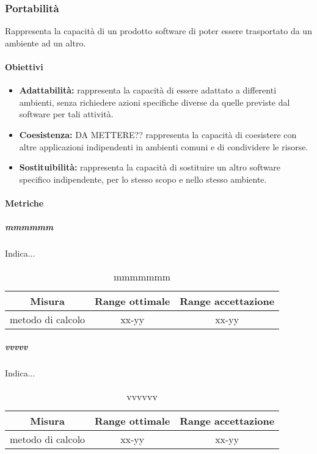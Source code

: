 	\subsubsection{Portabilità}
	Rappresenta la capacità di un prodotto software di poter essere trasportato da un ambiente ad un altro.
		
		\paragraph{Obiettivi}
			\begin{itemize}
				\item \textbf{Adattabilità:} rappresenta la capacità di essere adattato a differenti ambienti, senza richiedere azioni specifiche diverse da quelle previste dal software per tali attività.
				\item \textbf{Coesistenza:} DA METTERE?? rappresenta la capacità di coesistere con altre applicazioni indipendenti in ambienti comuni e di condividere le risorse.
				\item \textbf{Sostituibilità:} rappresenta la capacità di sostituire un altro software specifico indipendente, per lo stesso scopo e nello stesso ambiente.
			\end{itemize}
		
		\paragraph{Metriche}
			\subparagraph{mmmmmm}
			Indica...
			\begin{table}[H]
				\begin{center}
					\begin{tabular}{|c|c|c|}
						\hline
						\textbf{Misura} & \textbf{Range ottimale} & \textbf{Range accettazione} \\
						\hline
						metodo di calcolo & xx-yy  & xx-yy \\
						\hline
					\end{tabular}
				\end{center}
				\caption{mmmmmmm}
			\end{table}
			
			\subparagraph{vvvvv}
			Indica...
			\begin{table}[H]
				\begin{center}
					\begin{tabular}{|c|c|c|}
						\hline
						\textbf{Misura} & \textbf{Range ottimale} & \textbf{Range accettazione} \\
						\hline
						metodo di calcolo & xx-yy  & xx-yy \\
						\hline
					\end{tabular}
				\end{center}
				\caption{vvvvvv}
			\end{table}
	
